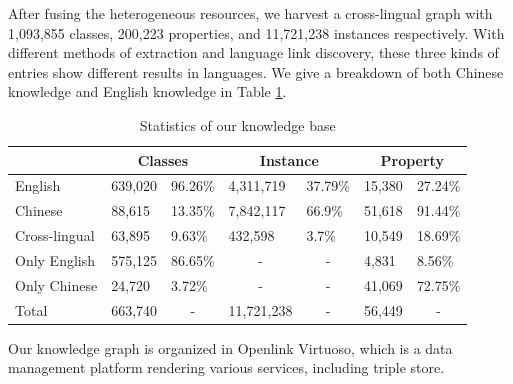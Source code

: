 \documentclass[runningheads,a4paper]{llncs}
\begin{document}
\begin{CJK*}{UTF8}{song}
After fusing the heterogeneous resources, we harvest a cross-lingual graph with 1,093,855 classes, 200,223 properties, and 11,721,238 instances respectively. With different methods of extraction and language link discovery, these three kinds of entries show different results in languages. We give a breakdown of both Chinese knowledge and English knowledge in Table \ref{tab:kb-result}.

\begin{table}[h]
\small
\centering
\caption{Statistics of our knowledge base}
\label{tab:kb-result}
\begin{tabular}{|l|l|l|l|l|l|l|}
\hline
\multicolumn{1}{|c|}{} & \multicolumn{2}{c|}{Classes}     & \multicolumn{2}{c|}{Instance}                   & \multicolumn{2}{c|}{Property}    \\ \hline
English                & 639,020 & 96.26\%                & 4,311,719              & 37.79\%                & 15,380  & 27.24\%                \\ \hline
Chinese                & 88,615  & 13.35\%                & 7,842,117              & 66.9\%                 & 51,618  & 91.44\%                \\ \hline
Cross-lingual          & 63,895  & 9.63\%                 & 432,598                & 3.7\%                  & 10,549  & 18.69\%                \\ \hline
Only English           & 575,125 & 86.65\%                & \multicolumn{1}{c|}{-} & \multicolumn{1}{c|}{-} & 4,831   & 8.56\%                 \\ \hline
Only Chinese           & 24,720  & 3.72\%                 & \multicolumn{1}{c|}{-} & \multicolumn{1}{c|}{-} & 41,069  & 72.75\%                \\ \hline
Total                  & 663,740 & \multicolumn{1}{c|}{-} & 11,721,238             & \multicolumn{1}{c|}{-} & 56,449  & \multicolumn{1}{c|}{-} \\ \hline
\end{tabular}
\end{table}

Our knowledge graph is organized in Openlink Virtuoso, which is a data management platform rendering various services, including triple store.


\end{CJK*}
\end{document}
